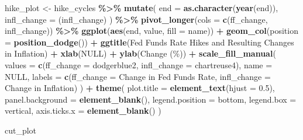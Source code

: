 \documentclass[
]{article}
\newenvironment{Shaded}{\begin{snugshade}}{\end{snugshade}}
\newcommand{\AttributeTok}[1]{\textcolor[rgb]{0.13,0.29,0.53}{#1}}
\newcommand{\ConstantTok}[1]{\textcolor[rgb]{0.56,0.35,0.01}{#1}}
\newcommand{\FloatTok}[1]{\textcolor[rgb]{0.00,0.00,0.81}{#1}}
\newcommand{\FunctionTok}[1]{\textcolor[rgb]{0.13,0.29,0.53}{\textbf{#1}}}
\newcommand{\NormalTok}[1]{#1}
\newcommand{\OtherTok}[1]{\textcolor[rgb]{0.56,0.35,0.01}{#1}}
\newcommand{\SpecialCharTok}[1]{\textcolor[rgb]{0.81,0.36,0.00}{\textbf{#1}}}
\newcommand{\StringTok}[1]{\textcolor[rgb]{0.31,0.60,0.02}{#1}}
\begin{document}
\begin{Shaded}
\begin{Highlighting}[]
\NormalTok{hike\_plot }\OtherTok{\textless{}{-}}\NormalTok{ hike\_cycles }\SpecialCharTok{\%\textgreater{}\%}
  \FunctionTok{mutate}\NormalTok{(}
    \AttributeTok{end =} \FunctionTok{as.character}\NormalTok{(}\FunctionTok{year}\NormalTok{(end)),}
    \AttributeTok{infl\_change =}\NormalTok{ (infl\_change)}
\NormalTok{  ) }\SpecialCharTok{\%\textgreater{}\%}
  \FunctionTok{pivot\_longer}\NormalTok{(}\AttributeTok{cols =} \FunctionTok{c}\NormalTok{(ff\_change, infl\_change)) }\SpecialCharTok{\%\textgreater{}\%} 
  \FunctionTok{ggplot}\NormalTok{(}\FunctionTok{aes}\NormalTok{(end, value, }\AttributeTok{fill =}\NormalTok{ name)) }\SpecialCharTok{+}
  \FunctionTok{geom\_col}\NormalTok{(}\AttributeTok{position =} \FunctionTok{position\_dodge}\NormalTok{()) }\SpecialCharTok{+}
  \FunctionTok{ggtitle}\NormalTok{(}\StringTok{\textquotesingle{}Fed Funds Rate Hikes and Resulting Changes in Inflation\textquotesingle{}}\NormalTok{) }\SpecialCharTok{+}
  \FunctionTok{xlab}\NormalTok{(}\ConstantTok{NULL}\NormalTok{) }\SpecialCharTok{+}
  \FunctionTok{ylab}\NormalTok{(}\StringTok{\textquotesingle{}Change (\%)\textquotesingle{}}\NormalTok{) }\SpecialCharTok{+} 
  \FunctionTok{scale\_fill\_manual}\NormalTok{(}
    \AttributeTok{values =} \FunctionTok{c}\NormalTok{(}\StringTok{\textquotesingle{}ff\_change\textquotesingle{}} \OtherTok{=} \StringTok{\textquotesingle{}dodgerblue2\textquotesingle{}}\NormalTok{, }\StringTok{\textquotesingle{}infl\_change\textquotesingle{}} \OtherTok{=} \StringTok{\textquotesingle{}chartreuse4\textquotesingle{}}\NormalTok{), }
    \AttributeTok{name =} \ConstantTok{NULL}\NormalTok{, }
    \AttributeTok{labels =} \FunctionTok{c}\NormalTok{(}\StringTok{\textquotesingle{}ff\_change\textquotesingle{}} \OtherTok{=} \StringTok{\textquotesingle{}Change in Fed Funds Rate\textquotesingle{}}\NormalTok{, }\StringTok{\textquotesingle{}infl\_change\textquotesingle{}} \OtherTok{=} \StringTok{\textquotesingle{}Change in Inflation\textquotesingle{}}\NormalTok{)}
\NormalTok{  ) }\SpecialCharTok{+}
  \FunctionTok{theme}\NormalTok{(}
    \AttributeTok{plot.title =} \FunctionTok{element\_text}\NormalTok{(}\AttributeTok{hjust =} \FloatTok{0.5}\NormalTok{),}
    \AttributeTok{panel.background =} \FunctionTok{element\_blank}\NormalTok{(),}
    \AttributeTok{legend.position =} \StringTok{\textquotesingle{}bottom\textquotesingle{}}\NormalTok{, }\AttributeTok{legend.box =} \StringTok{\textquotesingle{}vertical\textquotesingle{}}\NormalTok{,}
    \AttributeTok{axis.ticks.x =} \FunctionTok{element\_blank}\NormalTok{()}
\NormalTok{  )}

\NormalTok{cut\_plot}
\end{Highlighting}
\end{Shaded}
\end{document}
